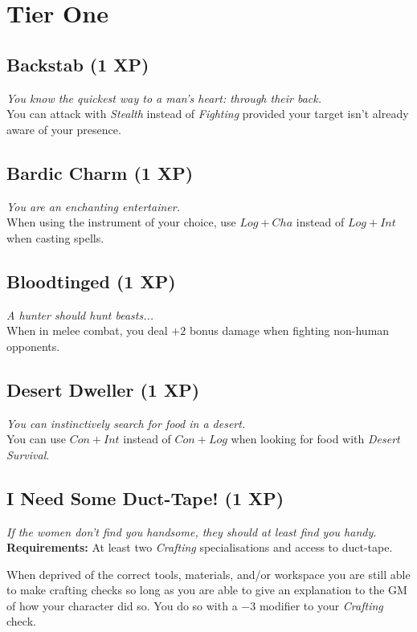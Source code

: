\section{Tier One}

\subsection*{Backstab (1 XP)}
\textit{You know the quickest way to a man's heart: through their back.}\\
You can attack with \textit{Stealth} instead of \textit{Fighting} provided your target isn't already aware of your presence.

\subsection*{Bardic Charm (1 XP)}
\textit{You are an enchanting entertainer.}\\
When using the instrument of your choice, use $Log+Cha$ instead of $Log+Int$ when casting spells.

\subsection*{Bloodtinged (1 XP)}
\textit{A hunter should hunt beasts...}\\
When in melee combat, you deal $+2$ bonus damage when fighting non-human opponents.

\subsection*{Desert Dweller (1 XP)}
\textit{You can instinctively search for food in a desert.}\\
You can use $Con + Int$ instead of $Con + Log$ when looking for food with \textit{Desert Survival}.

\subsection*{I Need Some Duct-Tape! (1 XP)}
\textit{If the women don't find you handsome, they should at least find you handy.}\\
\textbf{Requirements:} At least two \textit{Crafting} specialisations and access to duct-tape.

When deprived of the correct tools, materials, and/or workspace you are still able to make crafting checks so long as you are able to give an explanation to the GM of how your character did so.
You do so with a $-3$ modifier to your \textit{Crafting} check.


